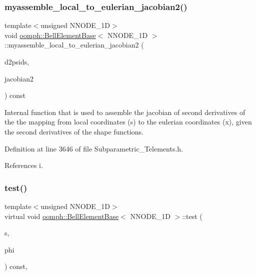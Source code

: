 \subsubsection{\texorpdfstring{myassemble\+\_\+local\+\_\+to\+\_\+eulerian\+\_\+jacobian2()}{myassemble\_local\_to\_eulerian\_jacobian2()}}
{\footnotesize\ttfamily template$<$unsigned N\+N\+O\+D\+E\+\_\+1D$>$ \\
void \hyperlink{classoomph_1_1BellElementBase}{oomph\+::\+Bell\+Element\+Base}$<$ N\+N\+O\+D\+E\+\_\+1D $>$\+::myassemble\+\_\+local\+\_\+to\+\_\+eulerian\+\_\+jacobian2 (\begin{DoxyParamCaption}\item[{const \hyperlink{classoomph_1_1DShape}{D\+Shape} \&}]{d2psids,  }\item[{\hyperlink{classoomph_1_1DenseMatrix}{Dense\+Matrix}$<$ double $>$ \&}]{jacobian2 }\end{DoxyParamCaption}) const\hspace{0.3cm}{\ttfamily [inline]}}

Internal function that is used to assemble the jacobian of second derivatives of the the mapping from local coordinates (s) to the eulerian coordinates (x), given the second derivatives of the shape functions. 

Definition at line 3646 of file Subparametric\+\_\+\+Telements.\+h.



References i.

\mbox{\label{classoomph_1_1BellElementBase_a76ddb90394c979f9967e8fd068bdf220}} 
\subsubsection{\texorpdfstring{test()}{test()}}
{\footnotesize\ttfamily template$<$unsigned N\+N\+O\+D\+E\+\_\+1D$>$ \\
virtual void \hyperlink{classoomph_1_1BellElementBase}{oomph\+::\+Bell\+Element\+Base}$<$ N\+N\+O\+D\+E\+\_\+1D $>$\+::test (\begin{DoxyParamCaption}\item[{const \hyperlink{classoomph_1_1Vector}{Vector}$<$ double $>$ \&}]{s,  }\item[{\hyperlink{classoomph_1_1Shape}{Shape} \&}]{phi }\end{DoxyParamCaption}) const\hspace{0.3cm}{\ttfamily [inline]}, {\ttfamily [virtual]}}



